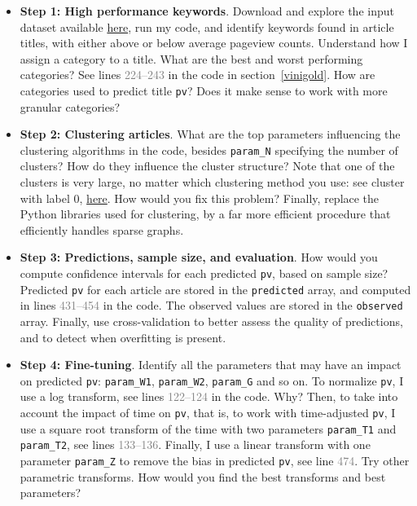 \documentclass[oneside,10pt]{book}
\begin{document}
\begin{itemize}
\item[] {\bf Step 1:  High performance keywords}. Download and explore the input dataset available \href{https://github.com/VincentGranville/Statistical-Optimization/blob/main/Articles-Pageviews.txt}{here}, run my code, and identify keywords found in article titles, with either above or below average pageview counts. Understand 
how I assign a category to a title. What are the best and worst performing categories? See lines \textcolor{gray}{224--243} in the code
 in section~\ref{vinigold}. How are categories used to predict title \texttt{pv}?  Does it make sense to work with more granular categories? 
 \vspace{1ex}
\item[] {\bf Step 2:  Clustering articles}. What are the top parameters influencing the clustering algorithms in the code, besides \texttt{param\_N}
 specifying the number of clusters? How do they influence the cluster structure? Note that one of the clusters is
 very large, no matter which clustering method you use: see cluster with label 0, \href{https://github.com/VincentGranville/Statistical-Optimization/blob/main/nlp_scoring_clusters_hierarchical.txt}{here}. How would you fix this problem? Finally, replace the Python libraries used for clustering, by a far more
 efficient procedure that efficiently handles sparse graphs. 
\vspace{1ex}
\item[] {\bf Step 3: Predictions, sample size, and evaluation}. How would you compute confidence intervals for each predicted \texttt{pv}, based on sample size?
Predicted \texttt{pv} for each article are stored in the \texttt{predicted} array, and computed in lines \textcolor{gray}{431--454} in the code. The observed values are stored in the \texttt{observed} array.
Finally, use \textcolor{index}{cross-validation} to better assess the quality of predictions, and to detect when overfitting is present. 
\vspace{1ex}
\item[] {\bf Step 4: Fine-tuning}. Identify all the parameters that may have an impact on predicted \texttt{pv}: \texttt{param\_W1}, \texttt{param\_W2}, \texttt{param\_G} and so on. 
To normalize \texttt{pv}, I use a log transform,  see lines \textcolor{gray}{122--124} in the code. Why? Then, to take into account the impact of time on \texttt{pv}, that is, 
to work with time-adjusted \texttt{pv}, 
I use a square root transform of the time with two parameters \texttt{param\_T1} and \texttt{param\_T2}, see lines \textcolor{gray}{133--136}. Finally, I use a linear transform with one parameter \texttt{param\_Z} to remove the bias in
 predicted \texttt{pv}, see line \textcolor{gray}{474}. Try other parametric transforms. How would you find the best transforms and
 best parameters?  
\end{itemize}
\vspace{1ex}
\end{document}
